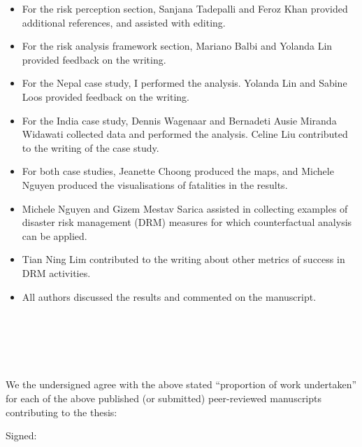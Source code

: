{\begin{itemize}
    \item For the risk perception section, Sanjana Tadepalli and Feroz Khan provided additional references, and assisted with editing.
    \item For the risk analysis framework section, Mariano Balbi and Yolanda Lin provided feedback on the writing.
    \item For the Nepal case study, I performed the analysis. Yolanda Lin and Sabine Loos provided feedback on the writing.
    \item For the India case study, Dennis Wagenaar and Bernadeti Ausie Miranda Widawati collected data and performed the analysis. Celine Liu contributed to the writing of the case study.
    \item For both case studies, Jeanette Choong produced the maps, and Michele Nguyen produced the visualisations of fatalities in the results.
    \item Michele Nguyen and Gizem Mestav Sarica assisted in collecting examples of disaster risk management (DRM) measures for which counterfactual analysis can be applied.
    \item Tian Ning Lim contributed to the writing about other metrics of success in DRM activities.
    \item All authors discussed the results and commented on the manuscript.
    
    \end{itemize}
    \\ \\ \noindent


\vspace{1 cm}
\\ \\ \noindent
We the undersigned agree with the above stated “proportion of work undertaken” for each of the above published (or submitted) peer-reviewed manuscripts contributing to the thesis:

 \vspace{.5cm}
\noindent Signed:

}
